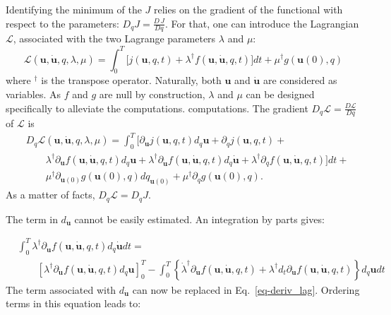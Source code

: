 \documentclass[10pt,openany,onecolumn,a4wide,pof]{article}
\newcommand{\gras}[1]{\boldsymbol{#1}}
\newcommand{\mypar}[1]{\left(#1\right)}
\newcommand{\mya}[1]{\left\{#1\right\}}
\newcommand{\fdyn}{f} %
\newcommand{\costf}{J} %
\newcommand{\costff}{j} %
\newcommand{\lag}{\mathcal{L}} %
\newcommand{\point}{\gras{u}} %
\begin{document}
Identifying the minimum of the $\costf$ relies on the gradient of the
functional with respect to the parameters:
$D_q\costf = \frac{D\,\costf}{Dq}$. For that, one can introduce the
Lagrangian $\lag$, associated with the two Lagrange parameters $\lambda$ and
$\mu$:
\begin{equation}
  \lag\mypar{\point,\dot{\point},q,\lambda,\mu}
  =
  \int_0^T
  \bigg[
  \costff(\point,q,t) + \lambda^{\dagger}\fdyn(\point,\dot{\point},q,t)
  \bigg] dt + \mu^{\dagger} g(\point(0),q) 
\label{eq-lag}
\end{equation}
where $^{\dagger}$ is the transpose operator. Naturally, both $\point$ and $\dot{\point}$ are considered as variables.
As $\fdyn$ and $g$ are null by construction, $\lambda$ and $\mu$ can be designed specifically to alleviate the computations.
computations.
The gradient $D_q\lag = \frac{D\lag}{Dq}$ of $\lag$ is
\begin{equation}
\begin{split}
&D_q\lag\mypar{\point,\dot{\point},q,\lambda,\mu} = \int_0^T  \bigg[\partial_{\point}\costff(\point,q,t)d_q \point  +\partial_{q} \costff(\point,q,t) + \\
& \qquad \lambda^{\dagger} \partial_{\point}  \fdyn(\point,\dot{\point},q,t) d_q \point + \lambda^{\dagger}\partial_{\dot{\point}} \fdyn(\point,\dot{\point},q,t)d_q \dot{\point}  + \lambda^{\dagger}\partial_q\fdyn(\point,\dot{\point},q,t) \bigg]dt + \\
& \qquad \mu^{\dagger} \partial_{\point(0)} g(\point(0),q) dq_{\point(0)}  + \mu^{\dagger} \partial_q g(\point(0),q) .
\end{split}
\label{eq-deriv_lag}
\end{equation}
As a matter of facts, $D_q\lag = D_q \costf$.

The term in $d_{\dot{\point}}$ cannot be easily estimated. An integration by parts gives:

\begin{equation*}
\begin{split}
&\int_0^T\lambda^{\dagger}\partial_{\dot{\point}} \fdyn(\point,\dot{\point},q,t)d_q \dot{\point} dt = \\
&\qquad [\lambda^{\dagger}\partial_{\dot{\point}} \fdyn(\point,\dot{\point},q,t) d_q \point ]_0^T - \int_0^T \mya{\dot{\lambda}^{\dagger}\partial_{\dot{\point}} \fdyn(\point,\dot{\point},q,t) + \lambda^{\dagger}d_t\partial_{\dot{\point}}\fdyn(\point,\dot{\point},q,t)}d_q \point dt
\end{split}
\end{equation*}
The term associated with $d_{\dot{\point}}$ can now be replaced in Eq.~\eqref{eq-deriv_lag}.
Ordering terms in this equation leads to:
\end{document}
